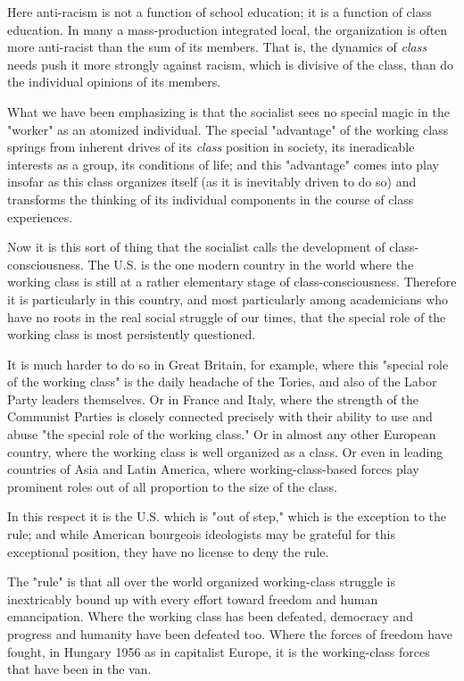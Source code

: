 Here anti-racism is not a function of school education; it is a function of class education. In many a mass-production integrated local, the organization is often more anti-racist than the sum of its members. That is, the dynamics of \emph{class} needs push it more strongly against racism, which is divisive of the class, than do the individual opinions of its members.

What we have been emphasizing is that the socialist sees no special magic in the "worker" as an atomized individual. The special "advantage" of the working class springs from inherent drives of its \emph{class} position in society, its ineradicable interests as a group, its conditions of life; and this "advantage" comes into play insofar as this class organizes itself (as it is inevitably driven to do so) and transforms the thinking of its individual components in the course of class experiences.

Now it is this sort of thing that the socialist calls the development of class-consciousness. The U.S. is the one modern country in the world where the working class is still at a rather elementary stage of class-consciousness. Therefore it is particularly in this country, and most particularly among academicians who have no roots in the real social struggle of our times, that the special role of the working class is most persistently questioned.

It is much harder to do so in Great Britain, for example, where this "special role of the working class" is the daily headache of the Tories, and also of the Labor Party leaders themselves. Or in France and Italy, where the strength of the Communist Parties is closely connected precisely with their ability to use and abuse "the special role of the working class." Or in almost any other European country, where the working class is well organized as a class. Or even in leading countries of Asia and Latin America, where working-class-based forces play prominent roles out of all proportion to the size of the class.

In this respect it is the U.S. which is "out of step," which is the exception to the rule; and while American bourgeois ideologists may be grateful for this exceptional position, they have no license to deny the rule.

The "rule" is that all over the world organized working-class struggle is inextricably bound up with every effort toward freedom and human emancipation. Where the working class has been defeated, democracy and progress and humanity have been defeated too. Where the forces of freedom have fought, in Hungary 1956 as in capitalist Europe, it is the working-class forces that have been in the van.

